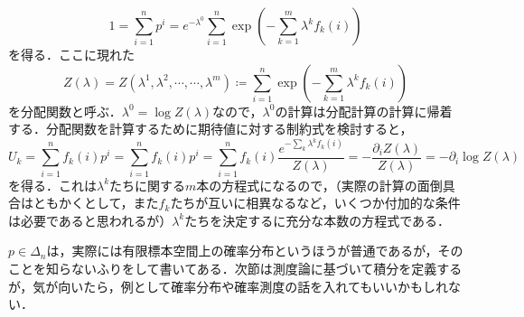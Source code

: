 \begin{exm}
\begin{itemize}
\begin{equation}
1 = \sum_{i=1}^n p^i = e^{- \lambda^0} \sum_{i=1}^n \exp\left(-\sum_{k=1}^m \lambda^k f_k(i)\right)
\end{equation}を得る．ここに現れた
\begin{equation}
Z(\lambda) = Z(\lambda^1, \lambda^2, \cdots, \cdots, \lambda^m) \coloneqq \sum_{i=1}^n \exp\left(-\sum_{k=1}^m \lambda^k f_k(i)\right)
\end{equation}を分配関数と呼ぶ．$\lambda^0 = \log Z(\lambda)$なので，$\lambda^0$の計算は分配計算の計算に帰着する．分配関数を計算するために期待値に対する制約式を検討すると，
\begin{equation}
U_k = \sum_{i=1}^n f_k(i)p^i = \sum_{i=1}^n f_k(i)p^i = \sum_{i=1}^n f_k(i) \frac{e^{-\sum_{k} \lambda^k f_k(i)}}{Z(\lambda)} = - \frac{\partial_i Z(\lambda)}{Z(\lambda)} = -\partial_i \log Z(\lambda)
\end{equation}を得る．これは$\lambda^k$たちに関する$m$本の方程式になるので，（実際の計算の面倒具合はともかくとして，また$f_k$たちが互いに相異なるなど，いくつか付加的な条件は必要であると思われるが）$\lambda^k$たちを決定するに充分な本数の方程式である．
\end{itemize}
\end{exm}

\begin{dig}
$p \in \Delta_n$は，実際には有限標本空間上の確率分布というほうが普通であるが，そのことを知らないふりをして書いてある．次節は測度論に基づいて積分を定義するが，気が向いたら，例として確率分布や確率測度の話を入れてもいいかもしれない．
\end{dig}

